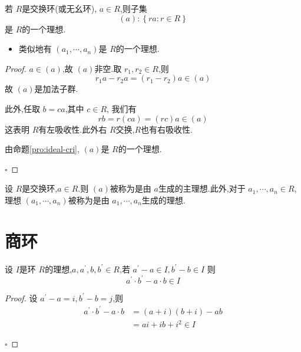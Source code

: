 \documentclass[lang=cn,12pt,color=green,fontset=none,pad]{elegantbook}
\begin{document}
\begin{proposition}
    若 $ R $是交换环(或无幺环), $ a \in R $,则子集 $$
    \left( a \right):  \left\{ ra: r \in R \right\} 
    $$是 $ R $的一个理想.   
\end{proposition}

\begin{remark}
    \begin{itemize}
        \item 类似地有 $ \left(  a_1,\cdots,a_n  \right)  $是 $ R $的一个理想.  
    \end{itemize}
    
\end{remark}
\begin{proof}
    $ a \in \left( a \right)  $,故 $ \left( a \right)  $非空.取 $ r_1,r_2\in R $,则 $$
    r_1a- r_2a=\left(r_1- r_2 \right)a \in  \left( a \right)  
    $$ 故 $ \left( a \right)  $是加法子群.
    
    此外,任取 $ b = ca $,其中 $ c \in R $, 我们有 $$
    rb = r\left( ca \right)= \left( rc \right)a  \in \left( a \right)   
    $$ 这表明 $ R $有左吸收性.此外右 $ R $交换,$ R $也有右吸收性.
    
    由命题\ref{pro:ideal-cri}, $ \left( a \right)  $是 $ R $的一个理想.  

    \hfill $\square$
\end{proof}

\begin{definition}
    设 $ R $是交换环,$ a \in R $.则 $ \left( a \right)  $被称为是由 $ a $生成的主理想.此外,对于 $  a_1,\cdots,a_n \in R $,理想 $ \left(  a_1,\cdots,a_n  \right)  $被称为是由 $  a_1,\cdots,a_n  $生成的理想.       
\end{definition}
\section{商环}  

\begin{lemma}
    设 $ I $是环 $ R $的理想,$ a,a^{\prime} ,b,b^{\prime}  \in R $,若 $ a^{\prime} -a \in I,b^{\prime} -b \in I $ 则 $$
    a^{\prime} \cdot b^{\prime} -a\cdot b \in I
    $$   
\end{lemma}

\begin{proof}
    设 $ a^{\prime} -a=i,b^{\prime} -b=j $,则 $$
    \begin{aligned}
        a^{\prime} \cdot b^{\prime} -a\cdot b & = \left( a+ i \right)  \left( b+ i \right)-ab\\ 
         & = ai+ ib+ i^{2} \in  I 
    \end{aligned}
    $$ 

    \hfill $\square$
\end{proof}
\end{document}
